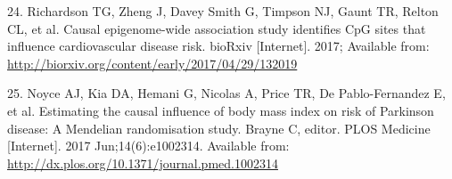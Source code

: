 \documentclass[]{article}
\begin{document}
\hypertarget{ref-Richardson2017}{}
24. Richardson TG, Zheng J, Davey Smith G, Timpson NJ, Gaunt TR, Relton
CL, et al. Causal epigenome-wide association study identifies CpG sites
that influence cardiovascular disease risk. bioRxiv {[}Internet{]}.
2017; Available from:
\url{http://biorxiv.org/content/early/2017/04/29/132019}

\hypertarget{ref-Noyce2017}{}
25. Noyce AJ, Kia DA, Hemani G, Nicolas A, Price TR, De Pablo-Fernandez
E, et al. Estimating the causal influence of body mass index on risk of
Parkinson disease: A Mendelian randomisation study. Brayne C, editor.
PLOS Medicine {[}Internet{]}. 2017 Jun;14(6):e1002314. Available from:
\url{http://dx.plos.org/10.1371/journal.pmed.1002314}
\end{document}
